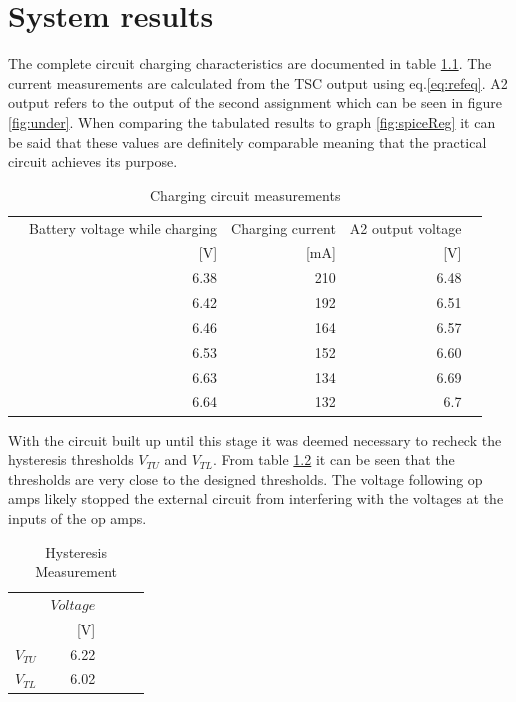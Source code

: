 \chapter{System results}\label{chap:sysres}

\label{sec:sysRes}
The complete circuit charging characteristics are documented in table \ref{tab:batsys}. The current measurements are calculated from the TSC output using eq.\ref{eq:refeq}. A2 output refers to the output of the second assignment which can be seen in figure \ref{fig:under}. When comparing the tabulated results to graph \ref{fig:spiceReg} it can be said that these values are definitely comparable meaning that the practical circuit achieves its purpose.


\begin{table}[!htb]
	\centering
	\footnotesize
	\caption{Charging circuit measurements}
	\begin{tabular}{lrrrr}
		\toprule
		&Battery voltage while charging& Charging current&A2 output voltage \\
		&  [V]&[mA]&[V] \\
		\midrule
		&6.38&210&6.48     \\
		&6.42&192&6.51     \\
		&6.46&164&6.57     \\
		&6.53&152&6.60     \\
		&6.63&134&6.69     \\
		&6.64&132&6.7     \\
		
		
		\bottomrule
	\end{tabular}
	\label{tab:batsys}
\end{table}


With the circuit built up until this stage it was deemed necessary to recheck the hysteresis thresholds $V_{TU}$ and $V_{TL}$. From table \ref{tab:hyst meas} it can be seen that the thresholds are very close to the designed thresholds. The voltage following op amps likely stopped the external circuit from interfering with the voltages at the inputs of the op amps. 
\begin{table}[!htb]
	\centering
	\footnotesize
	\caption{Hysteresis Measurement}
	\begin{tabular}{lrrrr}
		\toprule
		& $Voltage$ \\
		&  [V] \\
		\midrule
		$V_{TU}$      & 6.22  \\
		$V_{TL}$     & 6.02\\
		
		\bottomrule
	\end{tabular}
	\label{tab:hyst meas}
\end{table}



